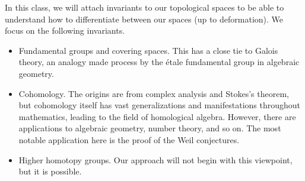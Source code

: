 \documentclass[../notes.tex]{subfiles}
\begin{document}
In this class, we will attach invariants to our topological spaces to be able to understand how to differentiate between our spaces (up to deformation). We focus on the following invariants.
\begin{itemize}
	\item Fundamental groups and covering spaces. This has a close tie to Galois theory, an analogy made process by the \'etale fundamental group in algebraic geometry.
	\item Cohomology. The origins are from complex analysis and Stokes's theorem, but cohomology itself has vast generalizations and manifestations throughout mathematics, leading to the field of homological algebra. However, there are applications to algebraic geometry, number theory, and so on. The most notable application here is the proof of the Weil conjectures.
	\item Higher homotopy groups. Our approach will not begin with this viewpoint, but it is possible.
\end{itemize}
\end{document}
